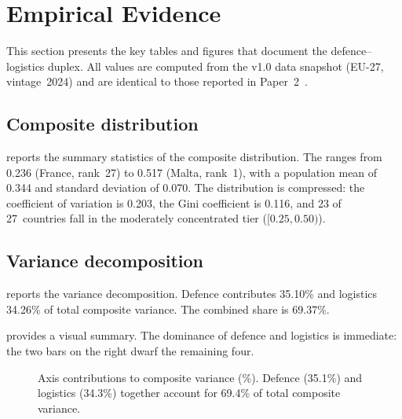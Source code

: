 \section{Empirical Evidence}\label{sec:empirics}

This section presents the key tables and figures that document the
defence--logistics duplex.  All values are computed from the
{\ISI} v1.0 data snapshot (EU-27, vintage~2024) and are identical
to those reported in Paper~2~\cite{isi_paper2}.

\subsection{Composite distribution}

 reports the summary statistics of the
composite distribution.  The {\ISI} ranges from 0.236 (France,
rank~27) to 0.517 (Malta, rank~1), with a population mean of
0.344 and standard deviation of 0.070.  The distribution is
compressed: the coefficient of variation is 0.203, the Gini
coefficient is 0.116, and 23 of 27~countries fall in the
moderately concentrated tier ($[0.25, 0.50)$).



\subsection{Variance decomposition}

 reports the variance decomposition.
Defence contributes 35.10\% and logistics 34.26\% of total
composite variance.  The combined share is 69.37\%.



 provides a visual summary.  The dominance
of defence and logistics is immediate: the two bars on the right
dwarf the remaining four.

\begin{figure}[htbp]
  \centering
  
  \caption{Axis contributions to composite variance (\%).
    Defence (35.1\%) and logistics (34.3\%) together account for
    69.4\% of total composite variance.}
  \label{fig:variance-bar}
\end{figure}

